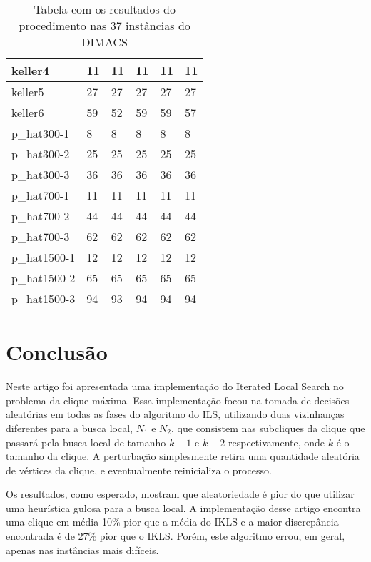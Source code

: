 \documentclass{article}
\begin{document}
\begin{center}
\begin{table}
\begin{tabular}{| l | l | l | l | l | l |}
keller4				&	11			&11			&11				&11				&11\\ \hline
keller5				&	27			&27			&27				&27				&27\\ \hline
keller6				&	59			&52			&59				&59				&57\\ \hline
p\_hat300-1			&	8			&8 			&8				&8				&8\\ \hline
p\_hat300-2			&	25			&25			&25				&25				&25\\ \hline
p\_hat300-3			&	36			&36			&36				&36				&36\\ \hline
p\_hat700-1			&	11			&11			&11				&11				&11\\ \hline
p\_hat700-2			&	44			&44			&44				&44				&44\\ \hline
p\_hat700-3			&	62			&62			&62				&62				&62\\ \hline
p\_hat1500-1		&	12			&12			&12				&12				&12\\ \hline
p\_hat1500-2		&	65			&65			&65				&65				&65\\ \hline
p\_hat1500-3		&	94			&93			&94				&94				&94\\ \hline
    \hline
\end{tabular}
\caption{Tabela com os resultados do procedimento nas 37 instâncias do DIMACS}
\end{table}
\end{center}

\section{Conclusão}

Neste artigo foi apresentada uma implementação do Iterated Local Search no problema da clique máxima. Essa implementação focou na tomada de decisões aleatórias em todas as fases do algoritmo do ILS, utilizando duas vizinhanças diferentes para a busca local, $N_1$ e $N_2$, que consistem nas subcliques da clique que passará pela busca local de tamanho $k-1$ e $k-2$ respectivamente, onde $k$ é o tamanho da clique. A perturbação simplesmente retira uma quantidade aleatória de vértices da clique, e eventualmente reinicializa o processo.\par

Os resultados, como esperado, mostram que aleatoriedade é pior do que utilizar uma heurística gulosa para a busca local. A implementação desse artigo encontra uma clique em média 10\% pior que a média do IKLS \cite{kopt} e a maior discrepância encontrada é de 27\% pior que o IKLS. Porém, este algoritmo errou, em geral, apenas nas instâncias mais difíceis.\par
\end{document}
